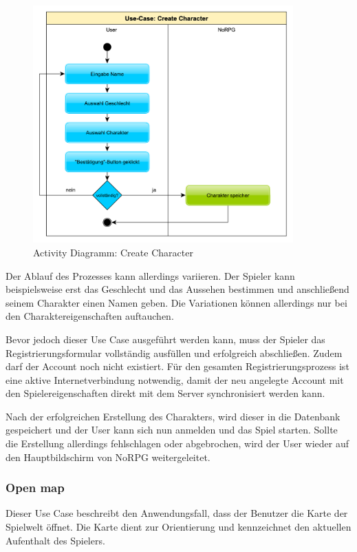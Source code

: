			\begin{figure}[htbp]
				\centering 
				\label{createCharakter}
				\includegraphics[width=10cm]{pics/CreateCharacter.pdf}
				\caption{Activity Diagramm: Create Character}
			\end{figure}
		
			Der Ablauf des Prozesses kann allerdings variieren. Der Spieler kann beispielsweise erst das Geschlecht und das Aussehen bestimmen und anschließend seinem Charakter einen Namen geben. Die Variationen können allerdings nur bei den Charaktereigenschaften auftauchen.
	
			Bevor jedoch dieser Use Case ausgeführt werden kann, muss der Spieler das Registrierungsformular vollständig ausfüllen und erfolgreich abschließen. Zudem darf der Account noch nicht existiert. Für den gesamten Registrierungsprozess ist eine aktive Internetverbindung notwendig, damit der neu angelegte Account mit den Spielereigenschaften direkt mit dem Server synchronisiert werden kann.
			
			Nach der erfolgreichen Erstellung des Charakters, wird dieser in die Datenbank gespeichert und der User kann sich nun anmelden und das Spiel starten. Sollte die Erstellung allerdings fehlschlagen oder abgebrochen, wird der User wieder auf den Hauptbildschirm von NoRPG weitergeleitet. 
			
		\subsubsection{Open map}
			Dieser Use Case beschreibt den Anwendungsfall, dass der Benutzer die Karte der Spielwelt öffnet. Die Karte dient zur Orientierung und kennzeichnet den aktuellen Aufenthalt des Spielers.
			
